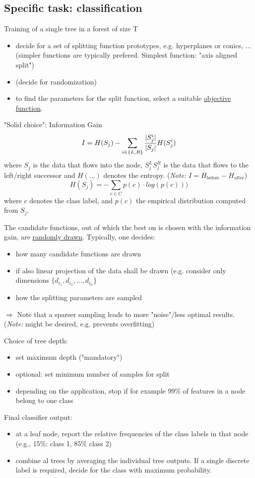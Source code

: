\documentclass{scrartcl}
\DeclarePairedDelimiter\abs{\lvert}{\rvert}%
\begin{document}
\subsection{Specific task: classification}
Training of a single tree in a forest of size T
\begin{itemize}
    \item
        decide for a set of splitting function prototypes, e.g. hyperplanes or conics, ... (simpler functions are typically prefered. Simplest function: "axis aligned split")
    \item
        (decide for randomization)
    \item
        to find the parameters for the split function, select a suitable \underline{objective function}. 
\end{itemize}
"Solid choice": Information Gain
\[I = H(S_j) - \sum_{i \in \{L,R\}} \frac{\abs{S^i_j}}{\abs{S_j}} H(S^i_j)\]
where \(S_j\) is the data that flows into the node, \(S^L_j S^R_j\) is the data that flows to the left/right successor and \(H(\dots)\) denotes the entropy. (\textit{Note:} \(I = H_{\text{before}} - H_{\text{after}}\))
\[H(S_j) = -\sum_{c \in C} p(c) \cdot log(p(c)))\] 
where \(c\) denotes the class label, and \(p(c)\) the empirical distribution computed from \(S_j\). 

The candidate functions, out of which the best on is chosen with the information gain, are \underline{randomly drawn}. Typically, one decides:
\begin{itemize}
    \item
        how many candidate functions are drawn
    \item
        if also linear projection of the data shall be drawn (e.g. consider only dimensions \(\{d_{i_1}, d_{i_2}, \dots, d_{i_n}\}\)
    \item
        how the splitting parameters are sampled
\end{itemize}
\(\Rightarrow\) Note that a sparser sampling leads to more "noise"/less optimal results. (\textit{Note:} might be desired, e.g. prevents overfitting)

Choice of tree depth:
\begin{itemize}
    \item
        set maximum depth ("mandatory")
    \item
        optional: set minimum number of samples for split 
    \item
        depending on the application, stop if for example 99\% of features in a node belong to one class
\end{itemize}

Final classifier output:
\begin{itemize}
    \item
        at a leaf node, report the relative frequencies of the class labels in that node (e.g., 15\%: class 1, 85\% class 2)
    \item
        combine al trees by averaging the individual tree outputs. If a single discrete label is required, decide for the class with maximum probability.
\end{itemize}
\end{document}
